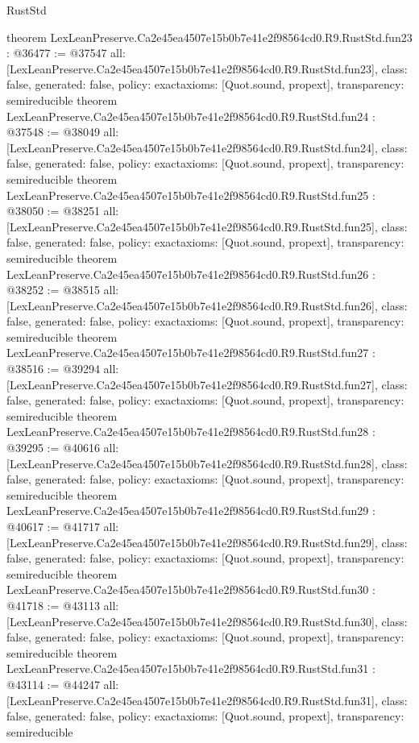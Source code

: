 \begin{lexlean}{RustStd}
\begin{coremodule}
{}
theorem LexLeanPreserve.Ca2e45ea4507e15b0b7e41e2f98564cd0.R9.RustStd.fun23 : @36477 := @37547 {
  all: [LexLeanPreserve.Ca2e45ea4507e15b0b7e41e2f98564cd0.R9.RustStd.fun23],
  class: false,
  generated: false,
  policy: exact{axioms: [Quot.sound, propext]},
  transparency: semireducible
}
theorem LexLeanPreserve.Ca2e45ea4507e15b0b7e41e2f98564cd0.R9.RustStd.fun24 : @37548 := @38049 {
  all: [LexLeanPreserve.Ca2e45ea4507e15b0b7e41e2f98564cd0.R9.RustStd.fun24],
  class: false,
  generated: false,
  policy: exact{axioms: [Quot.sound, propext]},
  transparency: semireducible
}
theorem LexLeanPreserve.Ca2e45ea4507e15b0b7e41e2f98564cd0.R9.RustStd.fun25 : @38050 := @38251 {
  all: [LexLeanPreserve.Ca2e45ea4507e15b0b7e41e2f98564cd0.R9.RustStd.fun25],
  class: false,
  generated: false,
  policy: exact{axioms: [Quot.sound, propext]},
  transparency: semireducible
}
theorem LexLeanPreserve.Ca2e45ea4507e15b0b7e41e2f98564cd0.R9.RustStd.fun26 : @38252 := @38515 {
  all: [LexLeanPreserve.Ca2e45ea4507e15b0b7e41e2f98564cd0.R9.RustStd.fun26],
  class: false,
  generated: false,
  policy: exact{axioms: [Quot.sound, propext]},
  transparency: semireducible
}
theorem LexLeanPreserve.Ca2e45ea4507e15b0b7e41e2f98564cd0.R9.RustStd.fun27 : @38516 := @39294 {
  all: [LexLeanPreserve.Ca2e45ea4507e15b0b7e41e2f98564cd0.R9.RustStd.fun27],
  class: false,
  generated: false,
  policy: exact{axioms: [Quot.sound, propext]},
  transparency: semireducible
}
theorem LexLeanPreserve.Ca2e45ea4507e15b0b7e41e2f98564cd0.R9.RustStd.fun28 : @39295 := @40616 {
  all: [LexLeanPreserve.Ca2e45ea4507e15b0b7e41e2f98564cd0.R9.RustStd.fun28],
  class: false,
  generated: false,
  policy: exact{axioms: [Quot.sound, propext]},
  transparency: semireducible
}
theorem LexLeanPreserve.Ca2e45ea4507e15b0b7e41e2f98564cd0.R9.RustStd.fun29 : @40617 := @41717 {
  all: [LexLeanPreserve.Ca2e45ea4507e15b0b7e41e2f98564cd0.R9.RustStd.fun29],
  class: false,
  generated: false,
  policy: exact{axioms: [Quot.sound, propext]},
  transparency: semireducible
}
theorem LexLeanPreserve.Ca2e45ea4507e15b0b7e41e2f98564cd0.R9.RustStd.fun30 : @41718 := @43113 {
  all: [LexLeanPreserve.Ca2e45ea4507e15b0b7e41e2f98564cd0.R9.RustStd.fun30],
  class: false,
  generated: false,
  policy: exact{axioms: [Quot.sound, propext]},
  transparency: semireducible
}
theorem LexLeanPreserve.Ca2e45ea4507e15b0b7e41e2f98564cd0.R9.RustStd.fun31 : @43114 := @44247 {
  all: [LexLeanPreserve.Ca2e45ea4507e15b0b7e41e2f98564cd0.R9.RustStd.fun31],
  class: false,
  generated: false,
  policy: exact{axioms: [Quot.sound, propext]},
  transparency: semireducible
}
\end{coremodule}
\end{lexlean}

